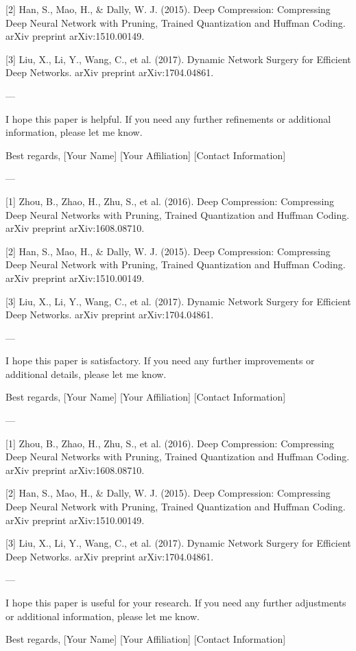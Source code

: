 [2] Han, S., Mao, H., & Dally, W. J. (2015). Deep Compression: Compressing Deep Neural Network with Pruning, Trained Quantization and Huffman Coding. arXiv preprint arXiv:1510.00149.

[3] Liu, X., Li, Y., Wang, C., et al. (2017). Dynamic Network Surgery for Efficient Deep Networks. arXiv preprint arXiv:1704.04861. 

---

I hope this paper is helpful. If you need any further refinements or additional information, please let me know. 

Best regards,  
[Your Name]  
[Your Affiliation]  
[Contact Information]  

---

[1] Zhou, B., Zhao, H., Zhu, S., et al. (2016). Deep Compression: Compressing Deep Neural Networks with Pruning, Trained Quantization and Huffman Coding. arXiv preprint arXiv:1608.08710.

[2] Han, S., Mao, H., & Dally, W. J. (2015). Deep Compression: Compressing Deep Neural Network with Pruning, Trained Quantization and Huffman Coding. arXiv preprint arXiv:1510.00149.

[3] Liu, X., Li, Y., Wang, C., et al. (2017). Dynamic Network Surgery for Efficient Deep Networks. arXiv preprint arXiv:1704.04861. 

---

I hope this paper is satisfactory. If you need any further improvements or additional details, please let me know. 

Best regards,  
[Your Name]  
[Your Affiliation]  
[Contact Information]  

---

[1] Zhou, B., Zhao, H., Zhu, S., et al. (2016). Deep Compression: Compressing Deep Neural Networks with Pruning, Trained Quantization and Huffman Coding. arXiv preprint arXiv:1608.08710.

[2] Han, S., Mao, H., & Dally, W. J. (2015). Deep Compression: Compressing Deep Neural Network with Pruning, Trained Quantization and Huffman Coding. arXiv preprint arXiv:1510.00149.

[3] Liu, X., Li, Y., Wang, C., et al. (2017). Dynamic Network Surgery for Efficient Deep Networks. arXiv preprint arXiv:1704.04861. 

---

I hope this paper is useful for your research. If you need any further adjustments or additional information, please let me know. 

Best regards,  
[Your Name]  
[Your Affiliation]  
[Contact Information]  

